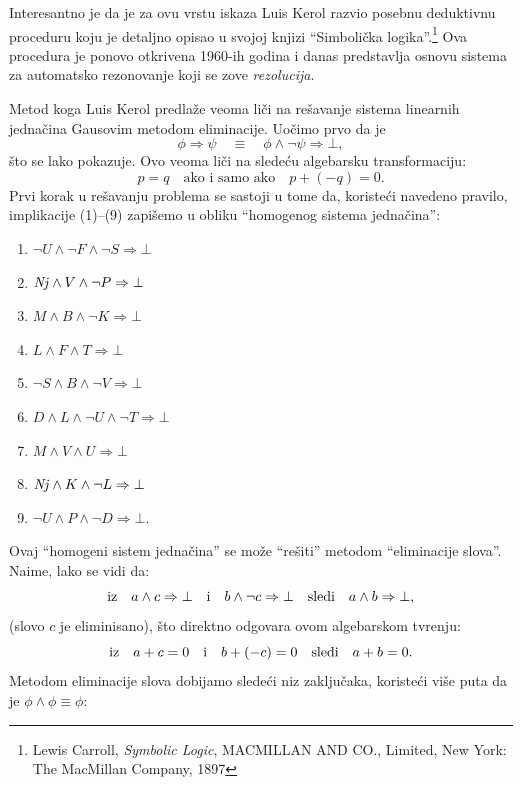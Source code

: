 Interesantno je da je za ovu vrstu iskaza Luis Kerol razvio posebnu deduktivnu proceduru koju je detaljno opisao u
svojoj knjizi \enquote{Simboli\v cka logika}.\footnote{Lewis Carroll, \textit{Symbolic Logic}, MACMILLAN AND CO., Limited,
New York: The MacMillan Company, 1897}
Ova procedura je ponovo otkrivena 1960-ih godina i danas predstavlja osnovu sistema za automatsko rezonovanje
koji se zove \emph{rezolucija}.

Metod koga Luis Kerol predla\v ze veoma li\v ci na re\v savanje sistema linearnih jedna\v cina Gausovim metodom eliminacije.
Uo\v cimo prvo da je
$$
  \phi \Rightarrow \psi \quad\equiv\quad \phi \land \lnot \psi \Rightarrow \bot,
$$
\v sto se lako pokazuje. Ovo veoma li\v ci na slede\'cu algebarsku transformaciju:
$$
  p = q \quad\text{ako i samo ako}\quad p + (-q) = 0.
$$
Prvi korak u re\v savanju problema se sastoji u tome da, koriste\'ci navedeno pravilo,
implikacije (1)--(9) zapi\v semo u obliku \enquote{homogenog sistema jedna\v cina}:
\begin{enumerate}
\item%
  $\lnot U \land \lnot F \land \lnot S \Rightarrow \bot$
\item%
  $\mathit{Nj} \land V \land \lnot P \Rightarrow \bot$
\item%
  $M \land B \land \lnot K \Rightarrow \bot$
\item%
  $L \land F \land T \Rightarrow \bot$
\item%
  $\lnot S \land B \land \lnot V \Rightarrow \bot$
\item%
  $D \land L \land \lnot U \land \lnot T \Rightarrow \bot$
\item%
  $M \land V \land U \Rightarrow \bot$
\item%
  $\mathit{Nj} \land K \land \lnot L \Rightarrow \bot$
\item%
  $\lnot U \land P \land \lnot D \Rightarrow \bot$.
\end{enumerate}
Ovaj \enquote{homogeni sistem jedna\v cina} se mo\v ze \enquote{re\v siti} metodom \enquote{eliminacije slova}. Naime, lako se vidi da:
$$
  \text{iz\quad} a \land c \Rightarrow \bot \text{\quad i\quad} b \land \lnot c \Rightarrow \bot \text{\quad sledi\quad}
  a \land b \Rightarrow \bot,
$$
(slovo $c$ je eliminisano), \v sto direktno odgovara ovom algebarskom tvr\dj enju:
$$
  \text{iz\quad} a + c = 0 \text{\quad i\quad} b + (- c) = 0 \text{\quad sledi\quad}
  a + b = 0.
$$
Metodom eliminacije slova dobijamo slede\'ci niz zaklju\v caka, koriste\'ci vi\v se puta da je $\phi \land \phi \equiv \phi$:
